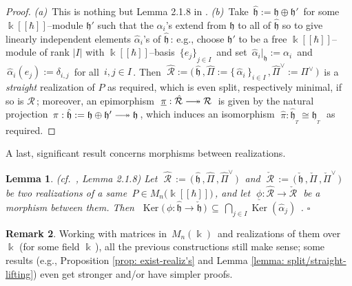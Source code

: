 \documentclass[12pt,reqno,twoside,a4paper]{amsart}
\numberwithin{equation}{section}
\newtheorem{lema}{Lemma}[subsection]
\theoremstyle{definition}
\newtheorem{rmk}[lema]{Remark}
\newtheorem{free text}[lema]{}
\theoremstyle{remark}
\newcommand \Ker{\operatorname{Ker}}
\newcommand{\R}{{\mathcal R}}
\def \kh{{\Bbbk[[\hbar]]}}
\def \lieh{\mathfrak{h}}
\theoremstyle{plain}
\begin{document}
\begin{proof}
%
   \textit{(a)}\,  This is nothing but Lemma 2.1.8 in  \cite{GG3}.
%
 \vskip5pt
%
   \textit{(b)}\,  Take  $ \, \hat{\lieh} := \lieh \oplus \lieh' \, $  for some  $ \kh $--module  $ \lieh' $  such that the  $ \alpha_i $'s  extend from  $ \lieh $  to all of  $ \hat{\lieh} $  so to give linearly independent elements  $ \hat{\alpha}_i $'s  of  $ \hat{\lieh} \, $:  e.g., choose  $ \lieh' $  to be a free  $ \kh $--module  of rank  $ |I| $  with  $ \kh $--basis  $ \, {\{e_j\}}_{j \in I} \, $  and set  $ \, \hat{\alpha}_i{\big|}_{\lieh} := \alpha_i \, $  and  $ \, \hat{\alpha}_i(e_j) := \delta_{i,j} \, $  for all  $ \, i, j \in I \, $.  Then  $ \; \hat{\R} := \big(\, \hat{\lieh} \, , \hat{\Pi} := {\big\{\, \hat{\alpha}_i \,\big\}}_{i \in I} \, , {\hat{\Pi}}^\vee := \Pi^\vee \,\big) \, $  is a  \textsl{straight\/}  realization of  $ P $  as required, which is even split, respectively minimal, if so is  $ \R \, $;  moreover, an epimorphism  $ \; \underline{\pi} : \hat{\R} \relbar\joinrel\twoheadrightarrow \R \; $  is given by  the natural projection  $ \, \pi : \hat{\lieh} := \lieh \oplus \lieh' \relbar\joinrel\twoheadrightarrow \lieh \, $,  which induces an isomorphism  $ \; \hat{\pi} : \hat{\lieh}_{{}_T} \cong \lieh_{{}_T} \; $  as required.
%
\end{proof}

\vskip7pt

   A last, significant result concerns morphisms between realizations.

\vskip11pt

\begin{lema}  \label{lemma: ker-morph's_realiz's}
  \textsl{(cf.\ \cite{GG3}, Lemma 2.1.8)}
%
 \vskip3pt
%
 Let  $ \; \hat{\R} \, := \, \big(\, \hat{\lieh} \, , \hat{\Pi} \, , \hat{\Pi}^\vee \,\big) \; $  and
 $ \; \check{\R} \, := \, \big(\, \check{\lieh} \, , \check{\Pi} \, , \check{\Pi}^\vee \,\big) \; $
 be two realizations of a same  $ \, P \in M_n\big(\kh\big) \, $,  and let
 $ \; \underline{\phi} : \hat{\R} \longrightarrow \check{\R} \; $
 be a morphism between them.  Then
 $ \; \Ker\big(\, \phi : \hat{\lieh} \longrightarrow \check{\lieh} \,\big) \, \subseteq \,
 \bigcap\limits_{j \in I} \Ker(\hat{\alpha}_j) \;\, $.   \hfill  $ \square $
%
\end{lema}

\vskip9pt

\begin{rmk}
%
 Working with matrices in  $ \, M_n(\Bbbk) \, $  and realizations of them over  $ \Bbbk $  (for some field  $ \Bbbk \, $),  all the previous constructions still make sense; some results (e.g.,  Proposition \ref{prop: exist-realiz's}  and  Lemma \ref{lemma: split/straight-lifting})  even get stronger and/or have simpler proofs.
%
\end{rmk}
\end{document}

